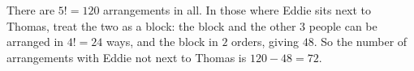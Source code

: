 There are $5!=120$ arrangements in all. In those where Eddie sits next to Thomas, treat the two as a block: the block and the other $3$ people can be arranged in $4!=24$ ways, and the block in $2$ orders, giving $48$. So the number of arrangements with Eddie not next to Thomas is $120-48=\boxed{72}$.
